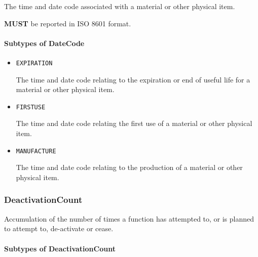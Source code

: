 The time and date code associated with a material or other physical item.
  
  \textbf{MUST} be reported in ISO 8601 format.


\paragraph{Subtypes of DateCode}\mbox{}
\label{sec:Subtypes of DateCode}

\begin{itemize}

\item \texttt{EXPIRATION}


The time and date code relating to the expiration or end of useful life for a material or other physical item.

\item \texttt{FIRST\textunderscore USE}


The time and date code relating the first use of a material or other physical item.

\item \texttt{MANUFACTURE}


The time and date code relating to the production of a material or other physical item.


\end{itemize}






\subsubsection{DeactivationCount}
\label{sec:DeactivationCount}



Accumulation of the number of times a function has attempted to, or is planned to attempt to, de-activate or cease.


\paragraph{Subtypes of DeactivationCount}\mbox{}
\label{sec:Subtypes of DeactivationCount}

